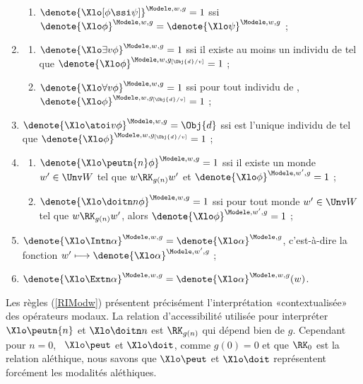 \begin{defi}
\begin{enumerate}[sem,series=RglSem3]
\begin{enumerate}
\item $\denote{\Xlo[\phi \ssi \psi]}^{\Modele,w,g}=1$ ssi $\denote{\Xlo\phi}^{\Modele,w,g}=\denote{\Xlo\psi}^{\Modele,w,g}$ ;
  \end{enumerate}
\item\label{RIQgw}
\begin{enumerate}
\item \(\denote{\Xlo\exists v \phi}^{\Modele,w,g} = 1\) ssi 
il existe au moins un individu  de  tel que \(\denote{\Xlo\phi}^{\Modele,w,g_{[\Obj{d}/v]}} = 1\) ;
\item \(\denote{\Xlo\forall v \phi}^{\Modele,w,g} = 1\) ssi pour tout
  individu  de , \(\denote{\Xlo\phi}^{\Modele,w,g_{[\Obj{d}/v]}} = 1\) ;
\end{enumerate}
\item 
\(\denote{\Xlo\atoi v \phi}^{\Modele,w,g}=\Obj{d}\) ssi  est
  l'unique individu de  tel que \(\denote{\Xlo\phi}^{\Modele,w,g_{[\Obj{d}/v]}}=1\) ; 
\item \label{RIModw}
\begin{enumerate}
\item \(\denote{\Xlo\peutn{n} \phi}^{\Modele,w,g} = 1\) ssi il existe un monde $w'\in \Unv W$ tel que $w\RK_{g(n)} w'$ et \(\denote{\Xlo\phi}^{\Modele,w',g} = 1\) ;
\item \(\denote{\Xlo\doitn n \phi}^{\Modele,w,g} = 1\) ssi pour tout monde $w'\in \Unv W$ tel que $w\RK_{g(n)} w'$, alors \(\denote{\Xlo\phi}^{\Modele,w',g} = 1\) ;
\end{enumerate}
\item \(\denote{\Xlo\Intn\alpha}^{\Modele,w,g} = \denote{\Xlo\alpha}^{\Modele,g}\), c'est-à-dire la fonction \(w'\longmapsto \denote{\Xlo\alpha}^{\Modele,w',g}\) ;
\item \(\denote{\Xlo\Extn\alpha}^{\Modele,w,g} = \denote{\Xlo\alpha}^{\Modele,w,g}(w)\).
\setcounter{RglSem}{\value{enumi}}
\end{enumerate}
\end{defi}

Les règles (\RSem\ref{RIModw}) présentent précisément l'interprétation «contextualisée» des opérateurs modaux. La relation d'accessibilité utilisée pour interpréter $\Xlo\peutn{n}$ et $\Xlo\doitn n$ est $\RK_{g(n)}$ qui dépend bien de $g$. 
Cependant pour $n=0$, \ie\ $\Xlo\peut$ et $\Xlo\doit$, comme $g(0)=0$ et que $\RK_0$ est la relation aléthique, nous savons que $\Xlo\peut$ et $\Xlo\doit$ représentent forcément les modalités aléthiques.



